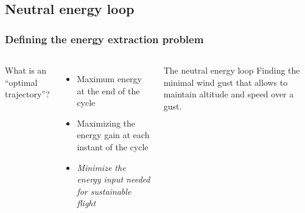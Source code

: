 \documentclass[compress]{beamer}
\begin{document}
\subsection{Neutral energy loop}

\begin{frame}
  \frametitle{Defining the energy extraction problem}
  \begin{columns}
    What is an ``optimal trajectory''?
    \begin{itemize}
      \item Maximum energy at the end of the cycle
      \item Maximizing the energy gain at each instant of the cycle
      \item \emph{Minimize the energy input needed for sustainable flight}
    \end{itemize}

    \begin{block}{The neutral energy loop}
     Finding the minimal wind gust that allows to maintain altitude and speed over a gust. 
    \end{block}
  \end{columns}
\end{frame}
\end{document}
